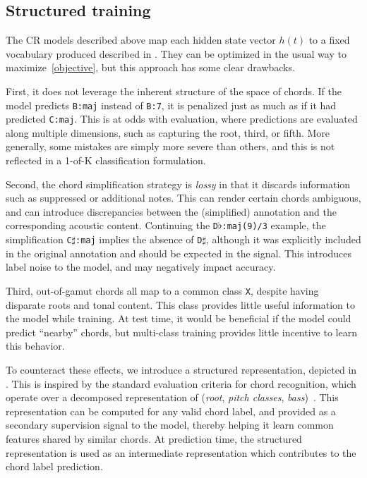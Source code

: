 \documentclass{article}
\begin{document}
\subsection{Structured training}
\label{sec:encoding}

The CR models described above map each hidden state vector $h(t)$ to a fixed vocabulary produced described in .
They can be optimized in the usual way to maximize~\eqref{objective}, but this approach has some clear drawbacks.

First, it does not leverage the inherent structure of the space of chords.
If the model predicts \texttt{B:maj} instead of \texttt{B:7}, it is penalized just as much as if it had predicted \texttt{C:maj}.
This is at odds with evaluation, where predictions are evaluated along multiple dimensions, such as capturing the root, third, or fifth.
More generally, some mistakes are simply more severe than others, and this is not reflected in a 1-of-K classification formulation.

Second, the chord simplification strategy is \emph{lossy} in that it discards information such as suppressed or additional notes.
This can render certain chords ambiguous, and can introduce discrepancies between the (simplified) annotation and the corresponding acoustic content.
Continuing the \texttt{D}$\flat$\texttt{:maj{(9)}/3} example, the simplification \texttt{C}$\sharp$\texttt{:maj} implies the absence of \texttt{D}$\sharp$, although it was explicitly included in the original annotation and should be expected in the signal.
This introduces label noise to the model, and may negatively impact accuracy.

Third, out-of-gamut chords all map to a common class \texttt{X}, despite having disparate roots and tonal content.
This class provides little useful information to the model while training.
At test time, it would be beneficial if the model could predict ``nearby'' chords, but multi-class training provides little incentive to learn this behavior.


To counteract these effects, we introduce a structured representation, depicted in .
This is inspired by the standard evaluation criteria for chord recognition, which operate over a decomposed representation of (\emph{root}, \emph{pitch classes}, \emph{bass})~\cite{raffel2014mir_eval}.
This representation can be computed for any valid chord label, and provided as a secondary supervision signal to the model, thereby helping it learn common features shared by similar chords.
At prediction time, the structured representation is used as an intermediate representation which contributes to the chord label prediction.
\end{document}
